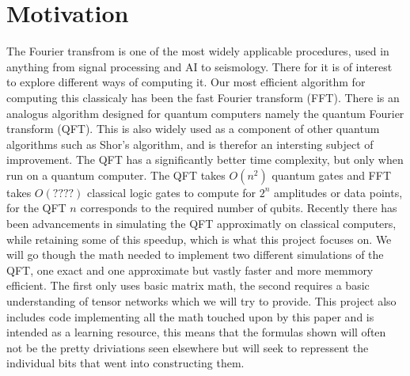 \section{Motivation}
The Fourier transfrom is one of the most widely applicable procedures, used in anything from signal processing and AI to seismology. There for it is of interest to explore different ways of computing it. 
Our most efficient algorithm for computing this classicaly has been the fast Fourier transform (FFT). There is an analogus algorithm designed for quantum computers namely the quantum Fourier transform (QFT). 
This is also widely used as a component of other quantum algorithms such as Shor's algorithm, and is therefor an intersting subject of improvement. 
The QFT has a significantly better time complexity, but only when run on a quantum computer. The QFT takes $O(n^2)$ quantum gates and FFT takes $O(????)$ classical logic gates to compute for $2^n$ amplitudes or data points, for the QFT $n$ corresponds to the required number of qubits. 
Recently there has been advancements in simulating the QFT approximatly on classical computers, while retaining some of this speedup, which is what this project focuses on. We will go though the math needed to implement two different simulations of the QFT, one exact and one approximate but vastly faster and more memmory efficient. The first only uses basic matrix math, the second requires a basic understanding of tensor networks which we will try to provide. This project also includes code implementing all the math touched upon by this paper and is intended as a learning resource, this means that the formulas shown will often not be the pretty driviations seen elsewhere but will seek to repressent the individual bits that went into constructing them.  
